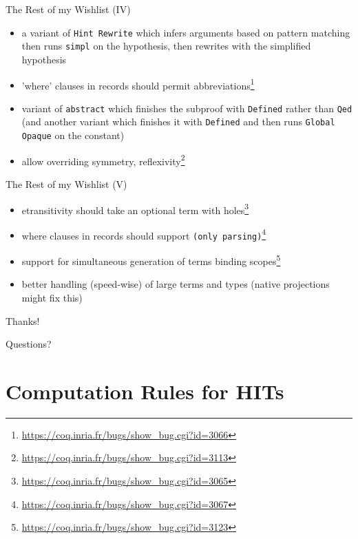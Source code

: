\documentclass{beamer}
\begin{document}
\begin{frame}{The Rest of my Wishlist (IV)}
\begin{itemize}
  \item 
    a variant of \texttt{Hint Rewrite} which infers arguments based on pattern matching then runs \texttt{simpl} on the hypothesis, then rewrites with the simplified hypothesis
  \item 
    'where' clauses in records should permit abbreviations\footnote{\url{https://coq.inria.fr/bugs/show\_bug.cgi?id=3066}}
  \item 
    variant of \texttt{abstract} which finishes the subproof with \texttt{Defined} rather than \texttt{Qed} (and another variant which finishes it with \texttt{Defined} and then runs \texttt{Global Opaque} on the constant)
  \item 
    allow overriding symmetry, reflexivity\footnote{\url{https://coq.inria.fr/bugs/show\_bug.cgi?id=3113}}
\end{itemize}
\end{frame}

\begin{frame}{The Rest of my Wishlist (V)}
\begin{itemize}
  \item 
    etransitivity should take an optional term with holes\footnote{\url{https://coq.inria.fr/bugs/show\_bug.cgi?id=3065}}
  \item 
    where clauses in records should support \texttt{(only parsing)}\footnote{\url{https://coq.inria.fr/bugs/show\_bug.cgi?id=3067}}
  \item 
    support for simultaneous generation of terms binding scopes\footnote{\url{https://coq.inria.fr/bugs/show\_bug.cgi?id=3123}}
  \item 
    better handling (speed-wise) of large terms and types (native projections might fix this)
\end{itemize}
\end{frame}

\begin{frame}
\Huge\begin{center}
Thanks!

Questions?
\end{center}
\end{frame}

\appendix


\section{Computation Rules for HITs} \label{sec:comp-hit}
\end{document}
